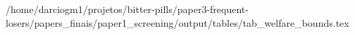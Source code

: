/home/darciogm1/projetos/bitter-pills/paper3-frequent-losers/papers_finais/paper1_screening/output/tables/tab_welfare_bounds.tex